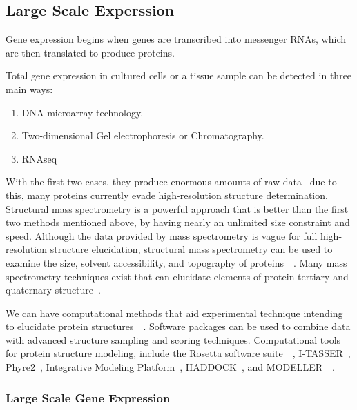 \documentclass{report}
\begin{document}
\subsection{Large Scale Experssion}

Gene expression begins when genes are transcribed into messenger RNAs, which are then translated to produce proteins. 

Total gene expression in cultured cells or a tissue sample can be detected in three main ways:

\begin{enumerate}
    \item DNA microarray technology.
    \item Two-dimensional Gel electrophoresis or Chromatography.
    \item RNAseq
\end{enumerate}

With the first two cases, they produce enormous amounts of raw data~\cite{zvelebil_understanding_2008} due to this, many proteins currently evade high-resolution structure determination. Structural mass spectrometry is a powerful approach that is better than the first two methods mentioned above, by having nearly an unlimited size constraint and speed. Although the data provided by mass spectrometry is vague for full high-resolution structure elucidation, structural mass spectrometry can be used to examine the size, solvent accessibility, and topography of proteins~\cite{limpikirati_covalent_2018}~\cite{liu_mass_2020}.  Many mass spectrometry techniques exist that can elucidate elements of protein tertiary and quaternary structure~\cite{biehn_protein_2022}.

We can have computational methods that aid experimental technique intending to elucidate protein structures~\cite{seffernick_hybrid_2020}~\cite{leman_macromolecular_2020}. Software packages can be used to combine data with advanced structure sampling and scoring techniques. Computational tools for protein structure modeling, include the Rosetta software suite~\cite{leman_macromolecular_2020}~\cite{alford_rosetta_2017}, I-TASSER~\cite{yang_i-tasser_2015}, Phyre2~\cite{kelley_phyre2_2015}, Integrative Modeling Platform~\cite{russel_putting_2012}, HADDOCK~\cite{dominguez_haddock_2003}, and MODELLER~\cite{eswar_comparative_2006}~\cite{biehn_protein_2022}.

\subsubsection{Large Scale Gene Expression}
\end{document}
